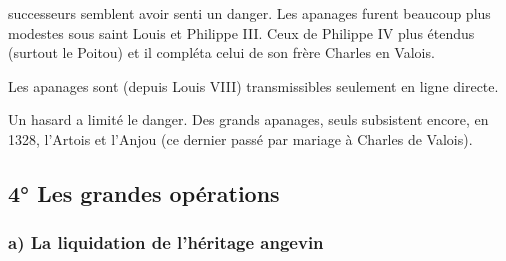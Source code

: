 \documentclass[french,twoside]{book} %
\begin{document}
\label{p22} successeurs semblent avoir senti un danger. Les apanages furent beaucoup plus modestes sous saint Louis et Philippe III. Ceux de Philippe IV plus étendus (surtout le Poitou) et il compléta celui de son frère Charles en Valois.\par
Les apanages sont (depuis Louis VIII) transmissibles seulement en ligne directe.\par
Un hasard a limité le danger. Des grands apanages, seuls subsistent encore, en 1328, l’Artois et l’Anjou (ce dernier passé par mariage à Charles de Valois).
\subsection[4° Les grandes opérations]{4° Les grandes opérations}
\label{c03c4}
\subsubsection[a) La liquidation de l’héritage angevin]{a) La liquidation de l’héritage angevin}
\end{document}
